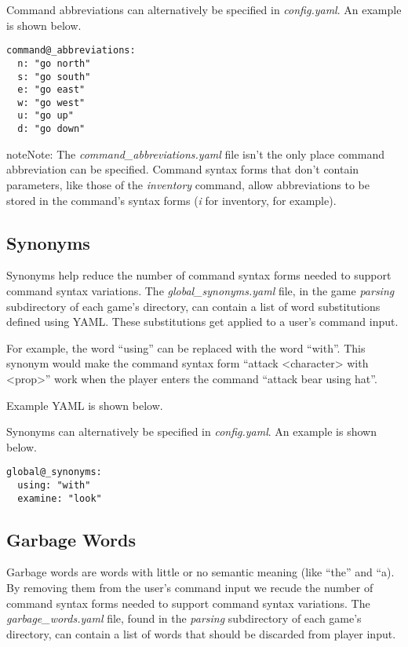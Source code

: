 \documentclass[letterpaper,10pt,english]{sphinxmanual}
\begin{document}
Command abbreviations can alternatively be specified in \emph{config.yaml}. An example is shown below.

\begin{Verbatim}[commandchars=@\[\]]
command@_abbreviations:
  n: "go north"
  s: "go south"
  e: "go east"
  w: "go west"
  u: "go up"
  d: "go down"
\end{Verbatim}

\begin{notice}{note}{Note:}
The \emph{command\_abbreviations.yaml} file isn't the only place command abbreviation can be specified. Command syntax forms that don't contain parameters, like those of the \emph{inventory} command, allow abbreviations to be stored in the command's syntax forms (\emph{i} for inventory, for example).
\end{notice}


\subsection{Synonyms}
\label{fine_tuning:synonyms}
Synonyms help reduce the number of command syntax forms needed to support command syntax variations. The \emph{global\_synonyms.yaml} file, in the game \emph{parsing} subdirectory of each game's directory, can contain a list of word substitutions defined using YAML. These substitutions get applied to a user's command input.

For example, the word ``using'' can be replaced with the word ``with''. This synonym would make the command syntax form ``attack \textless{}character\textgreater{} with \textless{}prop\textgreater{}'' work when the player enters the command ``attack bear using hat''.

Example YAML is shown below.

Synonyms can alternatively be specified in \emph{config.yaml}. An example is shown below.

\begin{Verbatim}[commandchars=@\[\]]
global@_synonyms:
  using: "with"
  examine: "look"
\end{Verbatim}


\subsection{Garbage Words}
\label{fine_tuning:garbage-words}
Garbage words are words with little or no semantic meaning (like ``the'' and ``a). By removing them from the user's command input we recude the number of command syntax forms needed to support command syntax variations. The \emph{garbage\_words.yaml} file, found in the \emph{parsing} subdirectory of each game's directory, can contain a list of words that should be discarded from player input.
\end{document}
